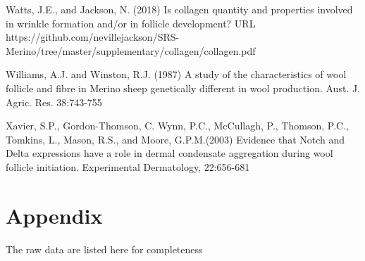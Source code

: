 \documentclass[titlepage]{article}  %
\begin{document}
\begin{thebibliography}{}
Watts, J.E., and Jackson, N. (2018) Is collagen quantity and properties involved in wrinkle formation and/or in follicle development? URL https://github.com/nevillejackson/SRS-Merino/tree/master/supplementary/collagen/collagen.pdf

Williams, A.J. and Winston, R.J. (1987) A study of the characteristics of wool follicle and fibre in Merino sheep genetically different in wool production. Aust. J. Agric. Res. 38:743-755

Xavier, S.P., Gordon-Thomson, C. Wynn, P.C., McCullagh, P., Thomson, P.C., Tomkins, L., Mason, R.S., and Moore, G.P.M.(2003) Evidence that Notch and Delta expressions have a role in dermal condensate aggregation during wool follicle initiation. Experimental Dermatology, 22:656-681

\end{thebibliography}

\appendix
\section{Appendix}
The raw data are listed here for completeness
\end{document}
